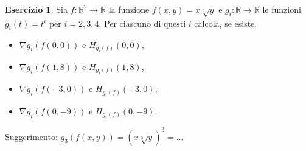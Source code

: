 \documentclass[12pt,a4paper]{article}
\theoremstyle{definition}
\newtheorem{exe}{Esercizio}
\begin{document}
\begin{exe}
    Sia $f: \mathbb{R}^2 \to \mathbb{R}$ la funzione $f(x,y) = x \sqrt[3]{y}$ e $g_i: \mathbb{R} \to \mathbb{R}$ le funzioni $g_i(t) = t^i$ per $i=2,3,4$. Per ciascuno di questi $i$ calcola, se esiste,
    \begin{itemize}
        \item $\nabla g_i(f(0,0))$ e $H_{g_i(f)}(0,0)$,
        \item $\nabla g_i(f(1,8))$ e $H_{g_i(f)}(1,8)$,
        \item $\nabla g_i(f(-3,0))$ e $H_{g_i(f)}(-3,0)$,
        \item $\nabla g_i(f(0,-9))$ e $H_{g_i(f)}(0,-9)$.
    \end{itemize}
    Suggerimento: $g_3(f(x,y)) = (x \sqrt[3]{y})^3 = \dots$
\end{exe}

\end{document}
